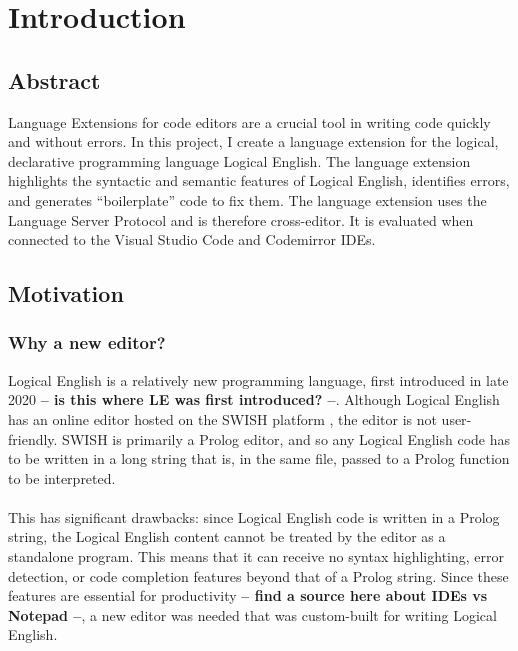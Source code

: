 \documentclass[../main.tex]{subfiles}
\begin{document}
\chapter{Introduction}
\section{Abstract}
Language Extensions for code editors are a crucial tool in writing code quickly and without errors. In this project, I create a language extension for the logical, declarative programming language Logical English. The language extension highlights the syntactic and semantic features of Logical English, identifies errors, and generates ``boilerplate'' code to fix them. The language extension uses the Language Server Protocol and is therefore cross-editor. It is evaluated when connected to the Visual Studio Code and Codemirror IDEs.
\section{Motivation}
\subsection{Why a new editor?}
Logical English is a relatively new programming language, first introduced in late 2020 \cite{logical_english} \textbf{ -- is this where LE was first introduced? --}. Although Logical English has an online editor hosted on the SWISH platform \cite{swish_editor}, the editor is not user-friendly. SWISH is primarily a Prolog editor, and so any Logical English code has to be written in a long string that is, in the same file, passed to a Prolog function to be interpreted. 
\\ \\ 
This has significant drawbacks: since Logical English code is written in a Prolog string, the Logical English content cannot be treated by the editor as a standalone program. This means that it can receive no syntax highlighting, error detection, or code completion features beyond that of a Prolog string. Since these features are essential for productivity \textbf{ -- find a source here about IDEs vs Notepad --}, a new editor was needed that was custom-built for writing Logical English.
\end{document}

